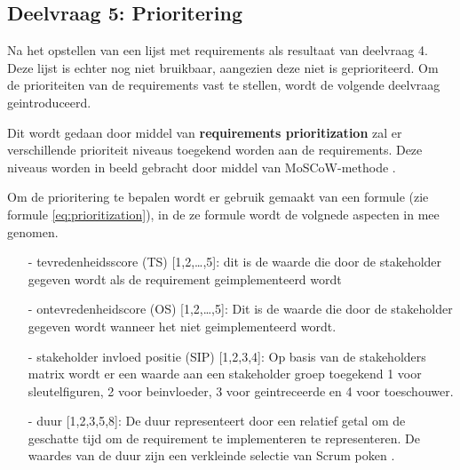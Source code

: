 \subsection{Deelvraag 5: Prioritering}
Na het opstellen van een lijst met requirements als resultaat van deelvraag 4.
Deze lijst is echter nog niet bruikbaar, aangezien deze niet is geprioriteerd.
Om de prioriteiten van de requirements vast te stellen, wordt de volgende deelvraag geintroduceerd.

\begin{center}
	\textit{\SubquestionFive}
\end{center}

\whitespace[0.2]
Dit wordt gedaan door middel van \textbf{requirements prioritization} zal er verschillende prioriteit niveaus toegekend worden aan de requirements.
Deze niveaus worden in beeld gebracht door middel van MoSCoW-methode \Parencite{MoSCoW}.
%

\whitespace
Om de prioritering te bepalen wordt er gebruik gemaakt van een formule (zie formule \ref{eq:prioritization}), in de ze formule wordt de volgnede aspecten in mee genomen.
\begin{enumerate}
	\item[-] tevredenheidsscore (TS) [1,2,\ldots,5]: dit is de waarde die door de stakeholder gegeven wordt als de requirement geimplementeerd wordt
	\item[-] ontevredenheidscore (OS) [1,2,\dots,5]: Dit is de waarde die door de stakeholder gegeven wordt wanneer het niet geimplementeerd wordt.
	\item[-] stakeholder invloed positie (SIP) [1,2,3,4]: Op basis van de stakeholders matrix wordt er een waarde aan een stakeholder groep toegekend 1 voor sleutelfiguren, 2 voor beinvloeder, 3 voor geintreceerde en 4 voor toeschouwer.
	\item[-] duur [1,2,3,5,8]: De duur representeert door een relatief getal om de geschatte tijd om de requirement te implementeren te representeren.
	      De waardes van de duur zijn een verkleinde selectie van Scrum poken \Parencite{ScrumPoker}.
\end{enumerate}
%
%

